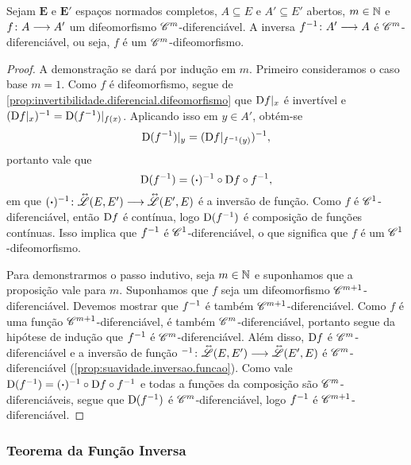\begin{proposition}
\label{prop:difeomorfismo.multidiferenciavel}
Sejam $\bm E$ e $\bm E'$ espaços normados completos, $A \subseteq E$ e $A' \subseteq E'$ abertos, $m \in \mathbb{N}$ e $f\colon \allowbreak A \longrightarrow A'$ um difeomorfismo $\mathscr{C}^m$-diferenciável. A inversa $f^{-1}\colon \allowbreak A' \longrightarrow A$ é $\mathscr{C}^m$-diferenciável, ou seja, $f$ é um $\mathscr{C}^m$-difeomorfismo.
\end{proposition}
\begin{proof}
A demonstração se dará por indução em $m$. Primeiro consideramos o caso base $m=1$. Como $f$ é difeomorfismo, segue de \ref{prop:invertibilidade.diferencial.difeomorfismo} que $\mathrm{D} f|_x$ é invertível e $(\mathrm{D} f|_{x})^{-1} = \mathrm{D} (f^{-1})|_{f(x)}$.
Aplicando isso em $y \in A'$, obtém-se
	\begin{equation*}
	\mathrm{D} (f^{-1})|_{y} = (\mathrm{D} f|_{f^{-1}(y)})^{-1},
	\end{equation*}
portanto vale que
	\begin{equation*}
	\mathrm{D} (f^{-1}) = (\bm{\cdot})^{-1} \circ \mathrm{D} f \circ f^{-1},
	\end{equation*}
em que $(\bm{\cdot})^{-1}\colon \allowbreak \accentset{\leftrightarrow\ }{\mathscr{L}}(E,E') \longrightarrow \accentset{\leftrightarrow\ }{\mathscr{L}}(E',E)$ é a inversão de função. Como $f$ é $\mathscr{C}^1$-diferenciável, então $\mathrm{D} f$ é contínua, logo $\mathrm{D} (f^{-1})$ é composição de funções contínuas. Isso implica que $f^{-1}$ é $\mathscr{C}^1$-diferenciável, o que significa que $f$ é um $\mathscr{C}^1$-difeomorfismo.

Para demonstrarmos o passo indutivo, seja $m \in \mathbb{N}$ e suponhamos que a proposição vale para $m$. Suponhamos que $f$ seja um difeomorfismo $\mathscr{C}^{m+1}$-diferenciável. Devemos mostrar que $f^{-1}$ é também $\mathscr{C}^{m+1}$-diferenciável. Como $f$ é uma função $\mathscr{C}^{m+1}$-diferenciável, é também $\mathscr{C}^m$-diferenciável, portanto segue da hipótese de indução que $f^{-1}$ é $\mathscr{C}^m$-diferenciável. Além disso, $\mathrm{D} f$ é $\mathscr{C}^m$-diferenciável e a inversão de função $^{-1}\colon \allowbreak \accentset{\leftrightarrow\ }{\mathscr{L}}(E,E') \longrightarrow \accentset{\leftrightarrow\ }{\mathscr{L}}(E',E)$ é $\mathscr{C}^m$-diferenciável (\ref{prop:suavidade.inversao.funcao}). Como vale $\mathrm{D} (f^{-1}) = (\bm{\cdot})^{-1} \circ \mathrm{D} f \circ f^{-1}$ e todas a funções da composição são $\mathscr{C}^m$-diferenciáveis, segue que $\mathrm{D} (f^{-1})$ é $\mathscr{C}^m$-diferenciável, logo $f^{-1}$ é $\mathscr{C}^{m+1}$-diferenciável.
\end{proof}

\subsubsection{Teorema da Função Inversa}

